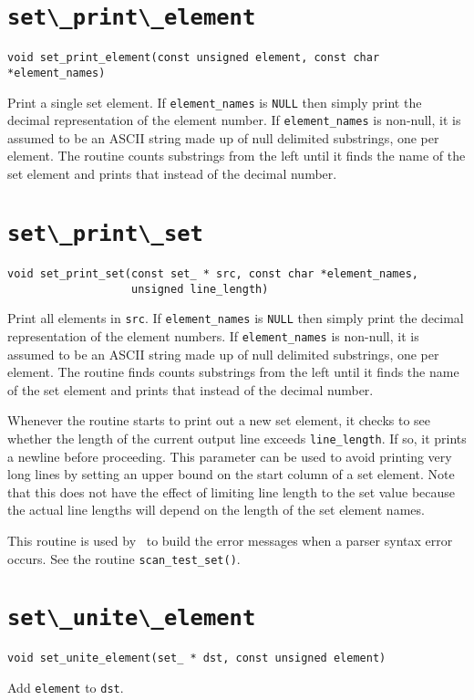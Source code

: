 \section{\protect\verb+set\_print\_element+}
\begin{verbatim}
void set_print_element(const unsigned element, const char *element_names)
\end{verbatim}
Print a single set element. If \verb+element_names+ is {\tt NULL} then
simply print the decimal representation of the element number. If
\verb+element_names+ is non-null, it is assumed to be an ASCII string
made up of null delimited substrings, one per element. The routine
 counts substrings from the left until it finds the name of the set
element and prints that instead of the decimal number.

\section{\protect\verb+set\_print\_set+}
\begin{verbatim}
void set_print_set(const set_ * src, const char *element_names, 
                   unsigned line_length)
\end{verbatim}
Print all elements in {\tt src}. If \verb+element_names+ is {\tt NULL}
then simply print the decimal representation of the element numbers. If
\verb+element_names+ is non-null, it is assumed to be an ASCII string
made up of null delimited substrings, one per element. The routine finds
counts substrings from the left until it finds the name of the set
element and prints that instead of the decimal number.

Whenever the routine starts to print out a new set element, it checks to see
whether the length of the current output line exceeds \verb+line_length+. If
so, it prints a newline before proceeding. This parameter can be used to 
avoid printing very long lines by setting an upper bound on the start column
of a set element. Note that this does not have the effect of limiting line
length to the set value because the actual line lengths will depend on the 
length of the set element names.

This routine is used by \rdp\ to build the error messages when a parser
syntax error occurs. See the routine \verb+scan_test_set()+.

\section{\protect\verb+set\_unite\_element+}
\begin{verbatim}
void set_unite_element(set_ * dst, const unsigned element)
\end{verbatim}
Add {\tt element} to {\tt dst}.

